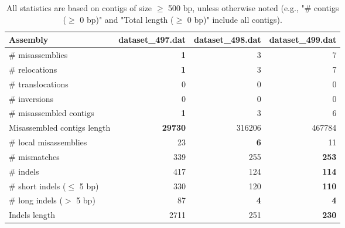 \documentclass[12pt,a4paper]{article}
\begin{document}
\begin{table}[ht]
\begin{center}
\caption{All statistics are based on contigs of size $\geq$ 500 bp, unless otherwise noted (e.g., "\# contigs ($\geq$ 0 bp)" and "Total length ($\geq$ 0 bp)" include all contigs).}
\begin{tabular}{|l*{3}{|r}|}
\hline
Assembly & dataset\_497.dat & dataset\_498.dat & dataset\_499.dat \\ \hline
\# misassemblies & {\bf 1} & 3 & 7 \\ \hline
\hspace{5mm}\# relocations & {\bf 1} & 3 & 7 \\ \hline
\hspace{5mm}\# translocations & 0 & 0 & 0 \\ \hline
\hspace{5mm}\# inversions & 0 & 0 & 0 \\ \hline
\# misassembled contigs & {\bf 1} & 3 & 6 \\ \hline
Misassembled contigs length & {\bf 29730} & 316206 & 467784 \\ \hline
\# local misassemblies & 23 & {\bf 6} & 11 \\ \hline
\# mismatches & 339 & 255 & {\bf 253} \\ \hline
\# indels & 417 & 124 & {\bf 114} \\ \hline
\hspace{5mm}\# short indels ($\leq$ 5 bp) & 330 & 120 & {\bf 110} \\ \hline
\hspace{5mm}\# long indels ($>$ 5 bp) & 87 & {\bf 4} & {\bf 4} \\ \hline
Indels length & 2711 & 251 & {\bf 230} \\ \hline
\end{tabular}
\end{center}
\end{table}
\end{document}
